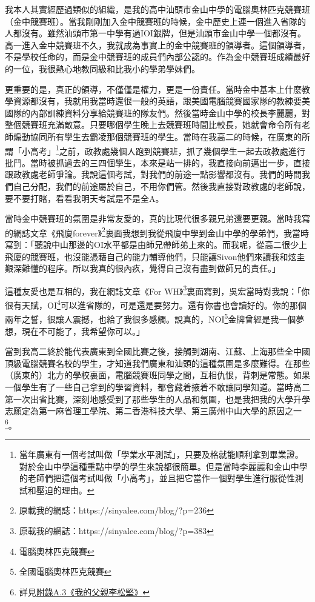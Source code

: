 我本人其實經歷過類似的組織，是我的高中汕頭市金山中學的電腦奧林匹克競賽班（金中競賽班）。當我剛剛加入金中競賽班的時候，金中歷史上連一個進入省隊的人都沒有。雖然汕頭市第一中學有過IOI銀牌，但是汕頭市金山中學一個都沒有。高一進入金中競賽班不久，我就成為事實上的金中競賽班的領導者。這個領導者，不是學校任命的，而是金中競賽班的成員們內部公認的。作為金中競賽班成績最好的一位，我很熱心地教同級和比我小的學弟學妹們。

更重要的是，真正的領導，不僅僅是權力，更是一份責任。當時金中基本上什麼教學資源都沒有，我就用我當時還很一般的英語，跟美國電腦競賽國家隊的教練要美國隊的內部訓練資料分享給競賽班的隊友們。然後當時金山中學的校長李麗麗，對整個競賽班充滿敵意。只要哪個學生晚上去競賽班時間比較長，她就會命令所有老師煽動協同所有學生去霸凌那個競賽班的學生。當時在我高二的時候，在廣東的所謂「小高考」\footnote{當年廣東有一個考試叫做「學業水平測試」，只要及格就能順利拿到畢業證。對於金山中學這種重點中學的學生來說都很簡單。但是當時李麗麗和金山中學的老師們把這個考試叫做「小高考」，並且把它當作一個對學生進行服從性測試和壓迫的理由。}之前，政教處幾個人跑到競賽班，抓了幾個學生一起去政教處進行批鬥。當時被抓過去的三四個學生，本來是站一排的，我直接向前邁出一步，直接跟政教處老師爭論。我說這個考試，對我們的前途一點影響都沒有。我們的時間我們自己分配，我們的前途屬於自己，不用你們管。然後我直接對政教處的老師說，要不要打賭，看看我明天考試是不是全A。

當時金中競賽班的氛圍是非常友愛的，真的比現代很多親兄弟還要更親。當時我寫的網誌文章《飛廈forever》\footnote{原載我的網誌：https://sinyalee.com/blog/?p=236}裏面我想到我從飛廈中學到金山中學的學弟們，我當時寫到：「聽說中山那邊的OI水平都是由師兄帶師弟上來的。而我呢，從高二很少上飛廈的競賽班，也沒能憑藉自己的能力輔導他們，只能讓Sivon他們來讀我和炫圭艱深難懂的程序。所以我真的很內疚，覺得自己沒有盡到做師兄的責任。」

這種友愛也是互相的，我在網誌文章《For WH》\footnote{原載我的網誌：https://sinyalee.com/blog/?p=383}裏面寫到，吳宏當時對我說：「你很有天賦，OI\footnote{電腦奧林匹克競賽}可以進省隊的，可是還是要努力。還有你書也會讀好的。你的那個兩年之誓，很讓人震撼，也給了我很多感觸。說真的，NOI\footnote{全國電腦奧林匹克競賽}金牌曾經是我一個夢想，現在不可能了，我希望你可以。」

當到我高二終於能代表廣東到全國比賽之後，接觸到湖南、江蘇、上海那些全中國頂級電腦競賽名校的學生，才知道我們廣東和汕頭的這種氛圍是多麼難得。在那些（廣東的）北方的學校裏面，電腦競賽班同學之間，互相仇恨，背刺是常態。如果一個學生有了一些自己拿到的學習資料，都會藏着掖着不敢讓同學知道。當時高二第一次出省比賽，深刻地感受到了那些學生的人品和氛圍，也是我把我的大學升學志願定為第一麻省理工學院、第二香港科技大學、第三廣州中山大學的原因之一\footnote{詳見\hyperref[3faces]{附錄A.3《我的父親李松堅》}}。

